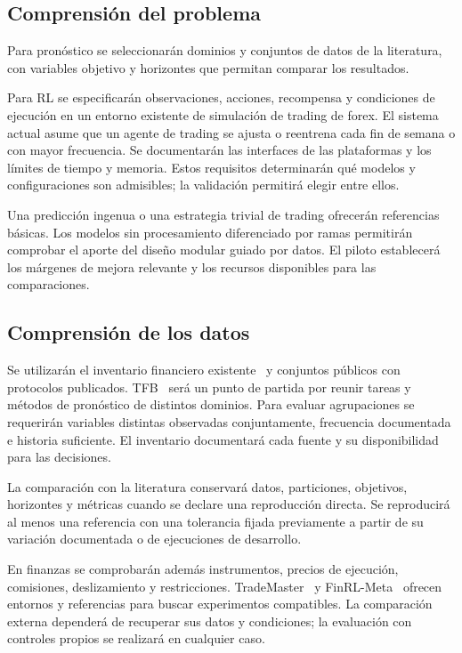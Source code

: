 \documentclass[11pt,letterpaper]{article}
\begin{document}
\subsection{Comprensión del problema}

Para pronóstico se seleccionarán dominios y conjuntos de datos de la literatura, con variables objetivo y horizontes que permitan comparar los resultados. 

Para RL se especificarán observaciones, acciones, recompensa y condiciones de ejecución en un entorno existente de simulación de trading de forex. El sistema actual asume que un agente de trading se ajusta o reentrena cada fin de semana o con mayor frecuencia. Se documentarán las interfaces de las plataformas y los límites de tiempo y memoria. Estos requisitos determinarán qué modelos y configuraciones son admisibles; la validación permitirá elegir entre ellos.

Una predicción ingenua o una estrategia trivial de trading ofrecerán referencias básicas. Los modelos sin procesamiento diferenciado por ramas permitirán comprobar el aporte del diseño modular guiado por datos. El piloto establecerá los márgenes de mejora relevante y los recursos disponibles para las comparaciones.

\subsection{Comprensión de los datos}
\label{sec:comparabilidad}

Se utilizarán el inventario financiero existente~\cite{financialdatalake} y conjuntos públicos con protocolos publicados. TFB~\cite{qiu2024tfb} será un punto de partida por reunir tareas y métodos de pronóstico de distintos dominios. Para evaluar agrupaciones se requerirán variables distintas observadas conjuntamente, frecuencia documentada e historia suficiente. El inventario documentará cada fuente y su disponibilidad para las decisiones.

La comparación con la literatura conservará datos, particiones, objetivos, horizontes y métricas cuando se declare una reproducción directa. Se reproducirá al menos una referencia con una tolerancia fijada previamente a partir de su variación documentada o de ejecuciones de desarrollo.

En finanzas se comprobarán además instrumentos, precios de ejecución, comisiones, deslizamiento y restricciones. TradeMaster~\cite{sun2023trademaster} y FinRL-Meta~\cite{liu2022finrlmeta} ofrecen entornos y referencias para buscar experimentos compatibles. La comparación externa dependerá de recuperar sus datos y condiciones; la evaluación con controles propios se realizará en cualquier caso.
\end{document}

